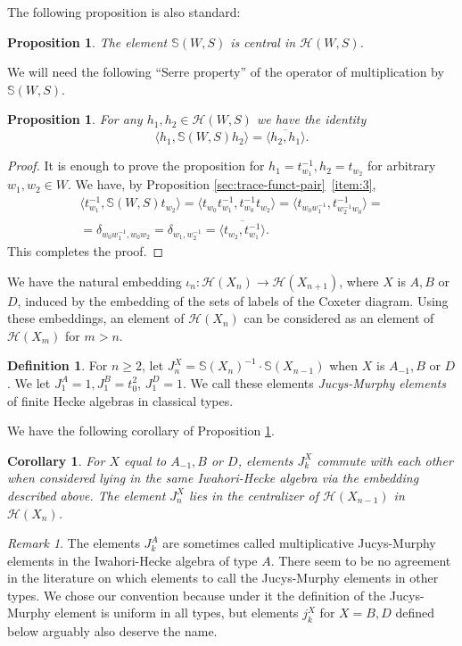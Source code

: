 \documentclass[11pt,leqno]{article}
\newtheorem{proposition}[theorem]{Proposition}
\newtheorem{corollary}[theorem]{Corollary}%
\theoremstyle{definition}
\newtheorem{definition}[theorem]{Definition}%
\theoremstyle{definition}
\theoremstyle{remark}
\newtheorem{remark}[theorem]{Remark}%
\newcommand{\He}{\mathcal{H}}
\newcommand{\Se}{\mathbb{S}}
\begin{document}
The following proposition is also standard:
\begin{proposition}
  \label{sec:iwah-hecke-algebr}
  The element $\Se(W,S)$ is central in $\He(W,S)$. 
\end{proposition}

We will need the following ``Serre property'' of the operator of multiplication by $\Se(W,S)$.
\begin{proposition}
  \label{sec:full-twist-jucys-1}
  For any $h_1, h_2 \in \He(W,S)$ we have the identity
  \[
   \langle h_1, \Se(W,S)h_2 \rangle = \overline{\langle h_2, h_1 \rangle}.
  \]
\end{proposition}
\begin{proof}
  It is enough to prove the proposition for $h_1 = t_{w_1}^{-1}, h_2 = t_{w_2}$ for arbitrary $w_1, w_2 \in W$. We have, by Proposition \ref{sec:trace-funct-pair}~\ref{item:3},
  \begin{multline*}
    \langle t_{w_1}^{-1}, \Se(W,S)t_{w_2} \rangle = \langle t_{w_0}t_{w_1}^{-1}, t_{w_0}^{-1}t_{w_2}\rangle = \langle t_{w_0w_1^{-1}}, t_{w_2^{-1}w_0}^{-1} \rangle =\\
    = \delta_{w_0w_1^{-1},w_0w_2} = \delta_{w_1,w_2^{-1}} = \overline{\langle t_{w_2}, t_{w_1}^{-1}\rangle}.
\end{multline*}
This completes the proof.
\end{proof}

We have the natural embedding $\iota_n:\He(X_n) \to \He(X_{n+1})$, where $X$ is $A, B$ or $D$, induced by the embedding of the sets of labels of the Coxeter diagram. Using these embeddings, an element of $\He(X_n)$ can be considered as an element of $\He(X_m)$ for $m > n$. 

\begin{definition}
  For $n \geq 2$, let $J_n^X = \Se(X_{n})^{-1}\cdot \Se(X_{n-1})$ when $X$ is $A_{-1}, B$ or $D$. We let $J_1^A = 1, J_1^B = t_0^2$, $J_1^D = 1$. We call these elements \emph{Jucys-Murphy elements} of finite Hecke algebras in classical types.

  
\end{definition}

We have the following corollary of Proposition \ref{sec:iwah-hecke-algebr}.
\begin{corollary}
  \label{sec:iwah-hecke-algebr-1}
   For $X$ equal to $A_{-1}, B$ or $D$, elements $J_k^X$ commute with each other when considered lying in the same Iwahori-Hecke algebra via the embedding described above. The element $J_n^X$ lies in the centralizer of $\He(X_{n-1})$ in $\He(X_{n})$.
\end{corollary}
\begin{remark}
  The elements $J_k^A$ are sometimes called multiplicative Jucys-Murphy elements in the Iwahori-Hecke algebra of type $A$. There seem to be no agreement in the literature on which elements to call the Jucys-Murphy elements in other types. We chose our convention because under it the definition of the Jucys-Murphy element is uniform in all types, but elements $j_k^X$ for $X = B, D$ defined below arguably also deserve the name.  
\end{remark}
\end{document}
